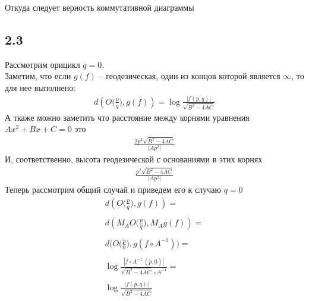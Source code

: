 		Откуда следует верность коммутативной диаграммы




		\subsection*{2.3}
		Рассмотрим орицикл $q=0$.\\
		Заметим, что если $g(f)$ -- геодезическая, один из концов которой является $\infty$, то для нее выполнено:
		\begin{gather*}
			d(O\Big(\frac{p}{q}\Big), g(f)) = \log\frac{|f(p,q)|}{\sqrt{B^2 - 4AC}}
		\end{gather*}
		А ткаже можно заметить что расстояние между корнями уравнения $Ax^2 + Bx + C = 0$ это
		\begin{gather*}
			\frac{2p^2 \sqrt{B^2 - 4AC}}{|Ap^2|}
		\end{gather*}
		И, соответственно, высота геодезической с основаниями в этих корнях
		\begin{gather*}
			\frac{p^2 \sqrt{B^2 - 4AC}}{|Ap^2|}
		\end{gather*}
		Теперь рассмотрим общий случай и приведем его к случаю $q=0$\\
		\begin{gather*}
			d(O\Big(\frac{p}{q}\Big), g(f)) = \\
			\\
			d(M_{A}O\Big(\frac{p}{q}\Big), M_{A} g(f)) = \\
			\\
			d(O\Big(\frac{\tilde{p}}{0}\Big), g(f \circ A^{-1})\Big) = \\
			\\
			\log \frac{|f \circ A^{-1}\ (\tilde{p}, 0)|}{\sqrt{B^2 - 4 AC} \circ A^{-1}} = \\
			\\
			\log\frac{|f(p,q)|}{\sqrt{B^2 - 4AC}}
		\end{gather*}